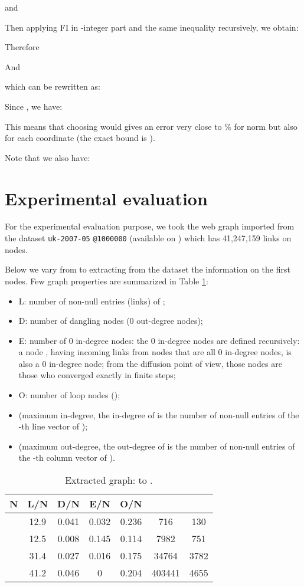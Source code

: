 \documentclass[conference]{IEEEtran}
\begin{document}
\begin{psfrags}
and

Then applying FI in -integer part and the same inequality recursively,
we obtain:


Therefore

And

which can be rewritten as:

Since , we have:


This means that choosing  would gives an error very close to \% for norm 
but also for each coordinate (the exact bound is ).

Note that we also have:



\section{Experimental evaluation}\label{sec:eval}


For the experimental evaluation purpose,
we took the web graph imported from the dataset \verb+uk-2007-05+ \verb+@1000000+
(available on \cite{webgraphit}) which has 41,247,159 links on  nodes.

Below we vary  from  to  extracting from the dataset the
information on the first  nodes.
Few graph properties are summarized in Table \ref{tab:1}:
\begin{itemize}
\item L: number of non-null entries (links) of ;
\item D: number of dangling nodes (0 out-degree nodes);
\item E: number of 0 in-degree nodes: the 0 in-degree nodes are defined recursively:
  a node , having incoming links from nodes that are all 0 in-degree nodes, is
  also a 0 in-degree node; from the diffusion point of view, those nodes are those
  who converged exactly in finite steps;
\item O: number of loop nodes ();
\item  (maximum in-degree, the in-degree of  is the number of
  non-null entries of the -th line vector of );
\item  (maximum out-degree, the out-degree of  is the number of
  non-null entries of the -th column vector of ).
\end{itemize}

\begin{table}
\begin{center}
\begin{tabular}{|l|cccccc|}
\hline
N        & L/N  & D/N   & E/N   & O/N &  & \\
\hline
   & 12.9 & 0.041 & 0.032 & 0.236 & 716   & 130\\
   & 12.5 & 0.008 & 0.145 & 0.114 & 7982  & 751\\
   & 31.4 & 0.027 & 0.016 & 0.175 & 34764 & 3782\\
   & 41.2 & 0.046 & 0     & 0.204 & 403441& 4655\\
\hline
\end{tabular}\caption{Extracted graph:  to .}\label{tab:1}
\end{center}
\end{table}


\end{psfrags}
\end{document}
